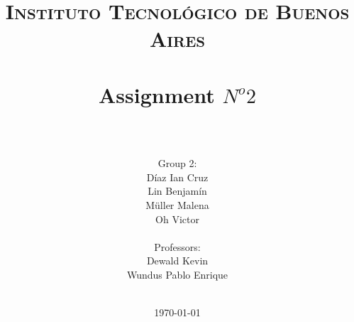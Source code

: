 




\title{
	\normalfont \normalsize \textsc{Instituto Tecnológico de Buenos Aires} \\ [25pt]
	\horrule{2pt} \\[0.4cm]
	\huge Assignment $N^o 2$ \\
	\horrule{2pt} \\[0cm]
\author{Group 2:\\Díaz Ian Cruz\\Lin Benjamín\\ Müller Malena\\Oh Victor \\ \\ Professors:\\Dewald Kevin\\Wundus Pablo Enrique\\ \\}
}
\date{\today} %

\maketitle
\newpage










%



